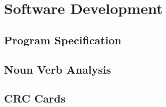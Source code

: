 \chapter{Software Development}

\section{Program Specification}

\section{Noun Verb Analysis}

\section{CRC Cards}

